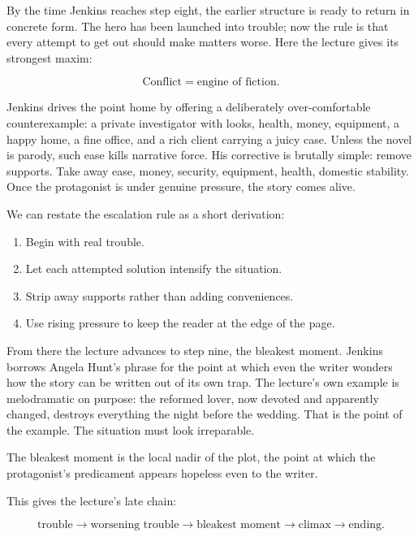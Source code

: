 By the time Jenkins reaches step eight, the earlier structure is ready to return in concrete form. The hero has been launched into trouble; now the rule is that every attempt to get out should make matters worse. Here the lecture gives its strongest maxim:

\begin{equation}
\text{Conflict}=\text{engine of fiction}.
\end{equation}

Jenkins drives the point home by offering a deliberately over-comfortable counterexample: a private investigator with looks, health, money, equipment, a happy home, a fine office, and a rich client carrying a juicy case. Unless the novel is parody, such ease kills narrative force. His corrective is brutally simple: remove supports. Take away ease, money, security, equipment, health, domestic stability. Once the protagonist is under genuine pressure, the story comes alive.

We can restate the escalation rule as a short derivation:

\begin{enumerate}
\item Begin with real trouble.
\item Let each attempted solution intensify the situation.
\item Strip away supports rather than adding conveniences.
\item Use rising pressure to keep the reader at the edge of the page.
\end{enumerate}

From there the lecture advances to step nine, the bleakest moment. Jenkins borrows Angela Hunt's phrase for the point at which even the writer wonders how the story can be written out of its own trap. The lecture's own example is melodramatic on purpose: the reformed lover, now devoted and apparently changed, destroys everything the night before the wedding. That is the point of the example. The situation must look irreparable.

\begin{definition}
The bleakest moment is the local nadir of the plot, the point at which the protagonist's predicament appears hopeless even to the writer.
\end{definition}

This gives the lecture's late chain:

\begin{equation}
\text{trouble} \to \text{worsening trouble} \to \text{bleakest moment} \to \text{climax} \to \text{ending}.
\end{equation}

